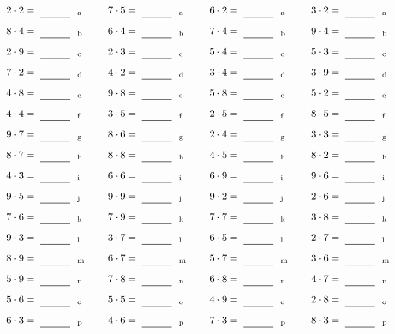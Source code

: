 \documentclass
[
  draft    = true,
  fontsize = 11pt,
  parskip  = half-
]
{scrartcl}
\begin{document}
\par\vfill\par
\begin{align*}
    \pline{2\cdot2}&=\rline{a}
  & \pline{7\cdot5}&=\rline{a}
  & \pline{6\cdot2}&=\rline{a}
  & \pline{3\cdot2}&=\rline{a} \\[1ex]
    \pline{8\cdot4}&=\rline{b}
  & \pline{6\cdot4}&=\rline{b}
  & \pline{7\cdot4}&=\rline{b}
  & \pline{9\cdot4}&=\rline{b} \\[1ex]
    \pline{2\cdot9}&=\rline{c}
  & \pline{2\cdot3}&=\rline{c}
  & \pline{5\cdot4}&=\rline{c}
  & \pline{5\cdot3}&=\rline{c} \\[1ex]
    \pline{7\cdot2}&=\rline{d}
  & \pline{4\cdot2}&=\rline{d}
  & \pline{3\cdot4}&=\rline{d}
  & \pline{3\cdot9}&=\rline{d} \\[1ex]
    \pline{4\cdot8}&=\rline{e}
  & \pline{9\cdot8}&=\rline{e}
  & \pline{5\cdot8}&=\rline{e}
  & \pline{5\cdot2}&=\rline{e} \\[1ex]
    \pline{4\cdot4}&=\rline{f}
  & \pline{3\cdot5}&=\rline{f}
  & \pline{2\cdot5}&=\rline{f}
  & \pline{8\cdot5}&=\rline{f} \\[1ex]
    \pline{9\cdot7}&=\rline{g}
  & \pline{8\cdot6}&=\rline{g}
  & \pline{2\cdot4}&=\rline{g}
  & \pline{3\cdot3}&=\rline{g} \\[1ex]
    \pline{8\cdot7}&=\rline{h}
  & \pline{8\cdot8}&=\rline{h}
  & \pline{4\cdot5}&=\rline{h}
  & \pline{8\cdot2}&=\rline{h} \\[1ex]
    \pline{4\cdot3}&=\rline{i}
  & \pline{6\cdot6}&=\rline{i}
  & \pline{6\cdot9}&=\rline{i}
  & \pline{9\cdot6}&=\rline{i} \\[1ex]
    \pline{9\cdot5}&=\rline{j}
  & \pline{9\cdot9}&=\rline{j}
  & \pline{9\cdot2}&=\rline{j}
  & \pline{2\cdot6}&=\rline{j} \\[1ex]
    \pline{7\cdot6}&=\rline{k}
  & \pline{7\cdot9}&=\rline{k}
  & \pline{7\cdot7}&=\rline{k}
  & \pline{3\cdot8}&=\rline{k} \\[1ex]
    \pline{9\cdot3}&=\rline{l}
  & \pline{3\cdot7}&=\rline{l}
  & \pline{6\cdot5}&=\rline{l}
  & \pline{2\cdot7}&=\rline{l} \\[1ex]
    \pline{8\cdot9}&=\rline{m}
  & \pline{6\cdot7}&=\rline{m}
  & \pline{5\cdot7}&=\rline{m}
  & \pline{3\cdot6}&=\rline{m} \\[1ex]
    \pline{5\cdot9}&=\rline{n}
  & \pline{7\cdot8}&=\rline{n}
  & \pline{6\cdot8}&=\rline{n}
  & \pline{4\cdot7}&=\rline{n} \\[1ex]
    \pline{5\cdot6}&=\rline{o}
  & \pline{5\cdot5}&=\rline{o}
  & \pline{4\cdot9}&=\rline{o}
  & \pline{2\cdot8}&=\rline{o} \\[1ex]
    \pline{6\cdot3}&=\rline{p}
  & \pline{4\cdot6}&=\rline{p}
  & \pline{7\cdot3}&=\rline{p}
  & \pline{8\cdot3}&=\rline{p}
\end{align*}
\end{document}
